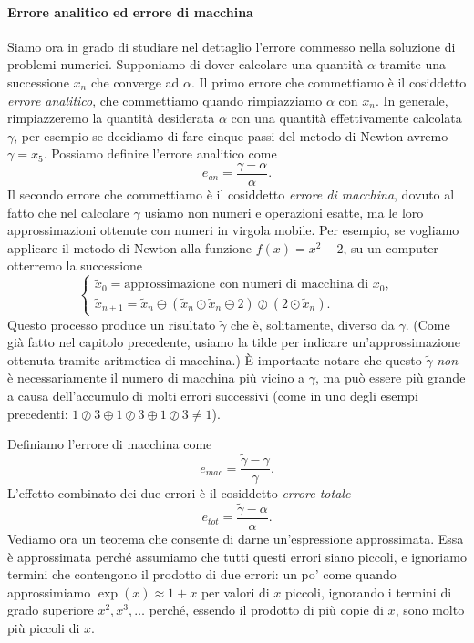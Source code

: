 \documentclass[a4paper]{report}
\theoremstyle{definiton}
\theoremstyle{remark}
\begin{document}
\paragraph{Errore analitico ed errore di macchina} Siamo ora in grado di studiare nel dettaglio l'errore commesso nella soluzione di problemi numerici. Supponiamo di dover calcolare una quantità $\alpha$ tramite una successione $x_n$ che converge ad $\alpha$. Il primo errore che commettiamo è il cosiddetto \emph{errore analitico}, che commettiamo quando rimpiazziamo $\alpha$ con $x_n$. In generale, rimpiazzeremo la quantità desiderata $\alpha$ con una quantità effettivamente calcolata $\gamma$, per esempio se decidiamo di fare cinque passi del metodo di Newton avremo $\gamma=x_5$. Possiamo definire l'errore analitico come
\begin{equation} \label{ean}
    e_{an} = \frac{\gamma - \alpha}{\alpha}.    
\end{equation}
Il secondo errore che commettiamo è il cosiddetto \emph{errore di macchina}, dovuto al fatto che nel calcolare $\gamma$ usiamo non numeri e operazioni esatte, ma le loro approssimazioni ottenute con numeri in virgola mobile. Per esempio, se vogliamo applicare il metodo di Newton alla funzione $f(x) = x^2 - 2$, su un computer otterremo la successione
\[
\begin{cases}
    \tilde{x}_0 = \text{approssimazione con numeri di macchina di $x_0$},\\
    \tilde{x}_{n+1} = \tilde{x}_n \ominus (\tilde{x}_n\odot \tilde{x}_n \ominus 2) \oslash (2\odot \tilde{x}_n).
\end{cases}
\]
Questo processo produce un risultato $\tilde{\gamma}$ che è, solitamente, diverso da $\gamma$. (Come già fatto nel capitolo precedente, usiamo la tilde per indicare un'approssimazione ottenuta tramite aritmetica di macchina.) È importante notare che questo $\tilde{\gamma}$ \emph{non} è necessariamente il numero di macchina più vicino a $\gamma$, ma può essere più grande a causa dell'accumulo di molti errori successivi (come in uno degli esempi precedenti: $1\oslash 3 \oplus 1\oslash 3 \oplus 1\oslash 3 \neq 1$). 

Definiamo l'errore di macchina come
\[
e_{mac} = \frac{\tilde{\gamma} - \gamma}{\gamma}.
\]
L'effetto combinato dei due errori è il cosiddetto \emph{errore totale}
\[
e_{tot} = \frac{\tilde{\gamma} - \alpha}{\alpha}.
\]
Vediamo ora un teorema che consente di darne un'espressione approssimata. Essa è approssimata perché assumiamo che tutti questi errori siano piccoli, e ignoriamo termini che contengono il prodotto di due errori: un po' come quando approssimiamo $\exp(x) \approx 1 + x$ per valori di $x$ piccoli, ignorando i termini di grado superiore $x^2, x^3, \dots$ perché, essendo il prodotto di più copie di $x$, sono molto più piccoli di $x$.
\end{document}
